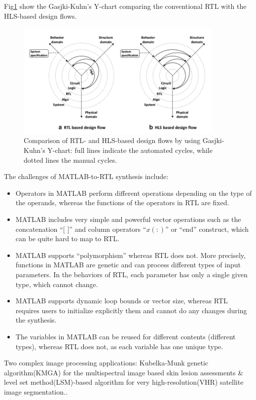 Fig\ref{fig1.3} show the Gasjki-Kuhn's Y-chart comparing the conventional RTL with the HLS-based design flows.\\
\begin{figure}[!hbtp]
\centering
\includegraphics[width=0.9\textwidth]{FPGAs/Paper1_2_Comparison}
\caption{Comparison of RTL- and HLS-based design flows by using Gasjki-Kuhn's Y-chart: full lines indicate the automated cycles, while dotted lines the manual cycles.}
\label{fig1.3}
\end{figure}
The challenges of MATLAB-to-RTL synthesis include:
\begin{itemize}
\item Operators in MATLAB perform different operations depending on the type of the operands, whereas the functions of the operators in RTL are fixed.
\item MATLAB includes very simple and powerful vector operations such as the concatenation ``[ ]'' and column operators ``$x(:)$'' or ``end'' construct, which can be quite hard to map to RTL.
\item MATLAB supports ``polymorphism'' whereas RTL does not. More precisely, functions in MATLAB are genetic and can process different types of input parameters. In the behaviors of RTL, each parameter has only a single given type, which cannot change.
\item MATLAB supports dynamic loop bounds or vector size, whereas RTL requires users to initialize explicitly them and cannot do any changes during the synthesis.
\item The variables in MATLAB can be reused for different contents (different types), whereas RTL does not, as each variable has one unique type.
\end{itemize}
\par\indent Two complex image processing applications: Kubelka-Munk genetic algorithm(KMGA) for the multispectral image based skin lesion assessments \& level set method(LSM)-based algorithm for very high-resolution(VHR) satellite image segmentation..